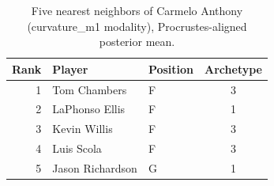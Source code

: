 \begin{table}[htbp]
  \centering\small
  \begin{tabular}{rllc}
    \toprule
    Rank & Player & Position & Archetype \\
    \midrule
    1 & Tom Chambers & F & 3 \\
    2 & LaPhonso Ellis & F & 1 \\
    3 & Kevin Willis & F & 3 \\
    4 & Luis Scola & F & 3 \\
    5 & Jason Richardson & G & 1 \\
    \bottomrule
  \end{tabular}
  \caption{Five nearest neighbors of Carmelo Anthony (curvature_m1 modality), Procrustes-aligned posterior mean.}
  \label{tab:Carmelo_Anthony_neighbors_curvature_m1}
\end{table}

